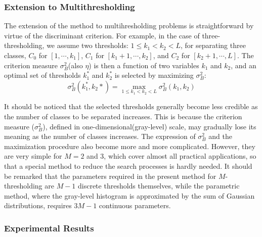 \subsubsection*{Extension to Multithresholding}

The extension of the method to multihresholding problems is straightforward by virtue of the discriminant criterion. For example, in the case of three-thresholding, we assume two thresholds: $1\leqslant k_1<k_2<L$, for separating three classes, $C_0$ for $[1,\cdots,k_1]$, $C_1$ for $[k_1+1,\cdots,k_2]$, and $C_2$ for $[k_2+1,\cdots,L]$. The criterion measure $\sigma_B^2$(also $\eta$) is then a function of two variables $k_1$ and $k_2$, and an optimal set of thresholds $k_1^*$ and $k_2^*$ is selected by maximizing $\sigma_B^2$:
\begin{equation*}
  \sigma_B^2(k_1^*,k_2*)=\max_{1\leqslant k_1<k_2<L}\sigma_B^2(k_1,k_2)
\end{equation*}

It should be noticed that the selected thresholds generally become less credible as the number of classes to be separated increases. This is because the criterion measure ($\sigma_B^2$), defined in one-dimensional(gray-level) scale, may gradually lose its meaning as the number of classes increases. The expression of $\sigma_B^2$ and the maximization procedure also become more and more complicated. However, they are very simple for $M=2$ and 3, which cover almost all practical applications, so that a special method to reduce the search processes is hardly needed. It should be remarked that the parameters required in the present method for $M$-thresholding are $M-1$ discrete thresholds themselves, while the parametric method, where the gray-level histogram is approximated by the sum of Gaussian distributions, requires $3M-1$ continuous parameters.

\subsubsection*{Experimental Results}

